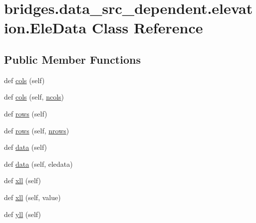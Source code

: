 \hypertarget{classbridges_1_1data__src__dependent_1_1elevation_1_1_ele_data}{}\section{bridges.\+data\+\_\+src\+\_\+dependent.\+elevation.\+Ele\+Data Class Reference}
\label{classbridges_1_1data__src__dependent_1_1elevation_1_1_ele_data}
\subsection*{Public Member Functions}
\begin{DoxyCompactItemize}
\item 
def \hyperlink{classbridges_1_1data__src__dependent_1_1elevation_1_1_ele_data_af9c8f34640f7c642e7f677b2e2249b9f}{cols} (self)
\item 
def \hyperlink{classbridges_1_1data__src__dependent_1_1elevation_1_1_ele_data_a0b97efb0e65234ae5f99ba3996ea96b8}{cols} (self, \hyperlink{classbridges_1_1data__src__dependent_1_1elevation_1_1_ele_data_a01622cab9ec625d57120f195c82e2c4e}{ncols})
\item 
def \hyperlink{classbridges_1_1data__src__dependent_1_1elevation_1_1_ele_data_ad31fe5180f8724693680c705850d6de7}{rows} (self)
\item 
def \hyperlink{classbridges_1_1data__src__dependent_1_1elevation_1_1_ele_data_aea0cde9fa7dcb3de0ad526b39ea4a95d}{rows} (self, \hyperlink{classbridges_1_1data__src__dependent_1_1elevation_1_1_ele_data_a9451760998220fcc4e214842fa5a5f65}{nrows})
\item 
def \hyperlink{classbridges_1_1data__src__dependent_1_1elevation_1_1_ele_data_afaa0a5516f1c573ad5363bbad52baa7c}{data} (self)
\item 
def \hyperlink{classbridges_1_1data__src__dependent_1_1elevation_1_1_ele_data_a54c5d5cb0aefc6f83366f342f3572cc8}{data} (self, eledata)
\item 
def \hyperlink{classbridges_1_1data__src__dependent_1_1elevation_1_1_ele_data_a19414830f100729c1b659acd3cc00905}{xll} (self)
\item 
def \hyperlink{classbridges_1_1data__src__dependent_1_1elevation_1_1_ele_data_a1fb07f071f9c21eb6b4169b47ebbeff2}{xll} (self, value)
\item 
def \hyperlink{classbridges_1_1data__src__dependent_1_1elevation_1_1_ele_data_ab6614ee1ad466541a0e94e33d9fadcdd}{yll} (self)

\end{DoxyCompactItemize}
